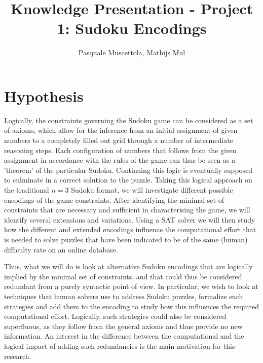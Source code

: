 \documentclass[10pt,a4paper,leqno]{article}
\begin{document}
\title{Knowledge Presentation - Project 1: Sudoku Encodings}
\author{Pasquale Muscettola, Mathijs Mul}
\maketitle

\section*{Hypothesis}


Logically, the constraints governing the Sudoku game can be considered as a set of axioms, which allow for the inference from an initial assignment of given numbers to a completely filled out grid through a number of intermediate reasoning steps. Each configuration of numbers that follows from the given assignment in accordance with the rules of the game can thus be seen as a 'theorem' of the particular Sudoku. Continuing this logic is eventually supposed to culminate in a correct solution to the puzzle. Taking this logical approach on the traditional $n = 3$ Sudoku format, we will investigate different possible encodings of the game constraints. After identifying the minimal set of constraints that are necessary and sufficient in characterising the game, we will identify several extensions and variations. Using a SAT solver we will then study how the different and extended encodings influence the computational effort that is needed to solve puzzles that have been indicated to be of the same (human) difficulty rate on an online database. 

Thus, what we will do is look at alternative Sudoku encodings that are logically implied by the minimal set of constraints, and that could thus be considered redundant from a purely syntactic point of view. In particular, we wish to look at techniques that human solvers use to address Sudoku puzzles, formalize such strategies and add them to the encoding to study how this influences the required computational effort. Logically, such strategies could also be considered superfluous, as they follow from the general axioms and thus provide no new information. An interest in the difference between the computational and the logical impact of adding such redundancies is the main motivation for this research. 
\end{document}
